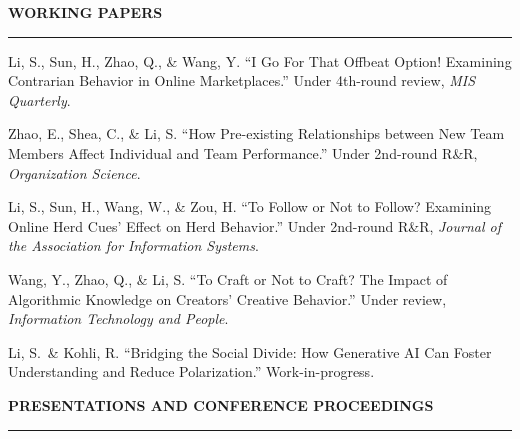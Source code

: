 \documentclass[11pt, letterpaper]{article}
\newcommand{\cvsection}[1]{%
  \vspace{14pt}%
  {\large\bfseries\color{headcolor}\MakeUppercase{#1}}%
  \vspace{2pt}\hrule\vspace{6pt}%
}
\begin{document}
\cvsection{Working Papers}

\begin{publist}
  \item Li, S., Sun, H., Zhao, Q., \& Wang, Y. ``I Go For That Offbeat Option! Examining Contrarian Behavior in Online Marketplaces.'' Under 4th-round review, \textit{MIS Quarterly}.

  \item Zhao, E., Shea, C., \& Li, S. ``How Pre-existing Relationships between New Team Members Affect Individual and Team Performance.'' Under 2nd-round R\&R, \textit{Organization Science}.

  \item Li, S., Sun, H., Wang, W., \& Zou, H. ``To Follow or Not to Follow? Examining Online Herd Cues' Effect on Herd Behavior.'' Under 2nd-round R\&R, \textit{Journal of the Association for Information Systems}.

  \item Wang, Y., Zhao, Q., \& Li, S. ``To Craft or Not to Craft? The Impact of Algorithmic Knowledge on Creators' Creative Behavior.'' Under review, \textit{Information Technology and People}.

  \item Li, S.\ \& Kohli, R. ``Bridging the Social Divide: How Generative AI Can Foster Understanding and Reduce Polarization.'' Work-in-progress.
\end{publist}

\cvsection{Presentations and Conference Proceedings}
\end{document}
